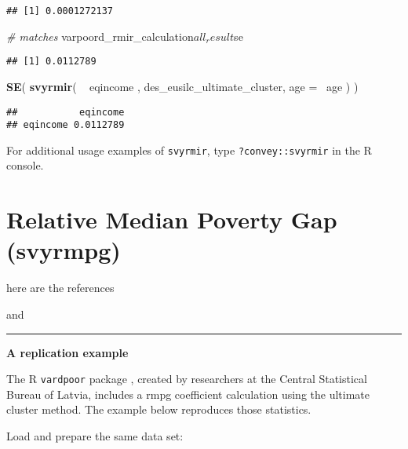\documentclass[]{book}
\newenvironment{Shaded}{\begin{snugshade}}{\end{snugshade}}
\newcommand{\KeywordTok}[1]{\textcolor[rgb]{0.13,0.29,0.53}{\textbf{{#1}}}}
\newcommand{\DataTypeTok}[1]{\textcolor[rgb]{0.13,0.29,0.53}{{#1}}}
\newcommand{\StringTok}[1]{\textcolor[rgb]{0.31,0.60,0.02}{{#1}}}
\newcommand{\CommentTok}[1]{\textcolor[rgb]{0.56,0.35,0.01}{\textit{{#1}}}}
\newcommand{\NormalTok}[1]{{#1}}
\theoremstyle{definition}
\theoremstyle{definition}
\theoremstyle{remark}
\begin{document}
\begin{verbatim}
## [1] 0.0001272137
\end{verbatim}

\begin{Shaded}
\begin{Highlighting}[]
\CommentTok{# matches}
\NormalTok{varpoord_rmir_calculation$all_result$se}
\end{Highlighting}
\end{Shaded}

\begin{verbatim}
## [1] 0.0112789
\end{verbatim}

\begin{Shaded}
\begin{Highlighting}[]
\KeywordTok{SE}\NormalTok{( }\KeywordTok{svyrmir}\NormalTok{( ~}\StringTok{ }\NormalTok{eqincome , des_eusilc_ultimate_cluster, }\DataTypeTok{age =} \NormalTok{~age ) ) }
\end{Highlighting}
\end{Shaded}

\begin{verbatim}
##           eqincome
## eqincome 0.0112789
\end{verbatim}

For additional usage examples of \texttt{svyrmir}, type
\texttt{?convey::svyrmir} in the R console.

\section{Relative Median Poverty Gap
(svyrmpg)}\label{relative-median-poverty-gap-svyrmpg}

here are the references

\citep{osier2009} and \citep{deville1999}

\begin{center}\rule{0.5\linewidth}{\linethickness}\end{center}

\textbf{A replication example}

The R \texttt{vardpoor} package \citep{vardpoor}, created by researchers
at the Central Statistical Bureau of Latvia, includes a rmpg coefficient
calculation using the ultimate cluster method. The example below
reproduces those statistics.

Load and prepare the same data set:
\end{document}
